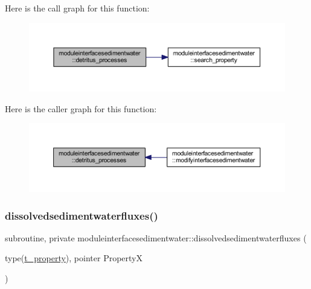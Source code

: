 Here is the call graph for this function\+:\nopagebreak
\begin{figure}[H]
\begin{center}
\leavevmode
\includegraphics[width=350pt]{namespacemoduleinterfacesedimentwater_a2327d7638eb1058aa8b3f9f188eda1c9_cgraph}
\end{center}
\end{figure}
Here is the caller graph for this function\+:\nopagebreak
\begin{figure}[H]
\begin{center}
\leavevmode
\includegraphics[width=350pt]{namespacemoduleinterfacesedimentwater_a2327d7638eb1058aa8b3f9f188eda1c9_icgraph}
\end{center}
\end{figure}
\mbox{\label{namespacemoduleinterfacesedimentwater_a892fef59c88570196d680f581deef4a9}} 
\subsubsection{\texorpdfstring{dissolvedsedimentwaterfluxes()}{dissolvedsedimentwaterfluxes()}}
{\footnotesize\ttfamily subroutine, private moduleinterfacesedimentwater\+::dissolvedsedimentwaterfluxes (\begin{DoxyParamCaption}\item[{type(\mbox{\hyperlink{structmoduleinterfacesedimentwater_1_1t__property}{t\+\_\+property}}), pointer}]{PropertyX }\end{DoxyParamCaption})\hspace{0.3cm}{\ttfamily [private]}}

